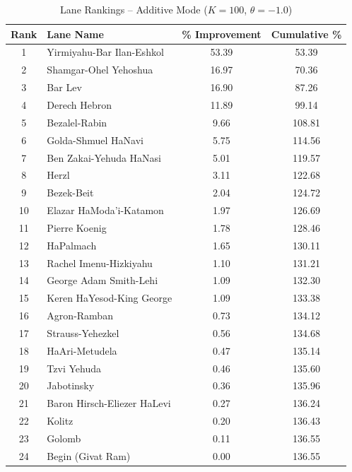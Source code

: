 \begin{table}[H]
\centering
\caption{Lane Rankings -- Additive Mode ($K=100$, $\theta=-1.0$)}
\label{tab:lane_rankings}
\begin{tabular}{@{}clcc@{}}
\toprule
\textbf{Rank} & \textbf{Lane Name} & \textbf{\% Improvement} & \textbf{Cumulative \%} \\
\midrule
1 & Yirmiyahu-Bar Ilan-Eshkol & 53.39 & 53.39 \\
2 & Shamgar-Ohel Yehoshua & 16.97 & 70.36 \\
3 & Bar Lev & 16.90 & 87.26 \\
4 & Derech Hebron & 11.89 & 99.14 \\
5 & Bezalel-Rabin & 9.66 & 108.81 \\
6 & Golda-Shmuel HaNavi & 5.75 & 114.56 \\
7 & Ben Zakai-Yehuda HaNasi & 5.01 & 119.57 \\
8 & Herzl & 3.11 & 122.68 \\
9 & Bezek-Beit & 2.04 & 124.72 \\
10 & Elazar HaModa'i-Katamon & 1.97 & 126.69 \\
11 & Pierre Koenig & 1.78 & 128.46 \\
12 & HaPalmach & 1.65 & 130.11 \\
13 & Rachel Imenu-Hizkiyahu & 1.10 & 131.21 \\
14 & George Adam Smith-Lehi & 1.09 & 132.30 \\
15 & Keren HaYesod-King George & 1.09 & 133.38 \\
16 & Agron-Ramban & 0.73 & 134.12 \\
17 & Strauss-Yehezkel & 0.56 & 134.68 \\
18 & HaAri-Metudela & 0.47 & 135.14 \\
19 & Tzvi Yehuda & 0.46 & 135.60 \\
20 & Jabotinsky & 0.36 & 135.96 \\
21 & Baron Hirsch-Eliezer HaLevi & 0.27 & 136.24 \\
22 & Kolitz & 0.20 & 136.43 \\
23 & Golomb & 0.11 & 136.55 \\
24 & Begin (Givat Ram) & 0.00 & 136.55 \\
\bottomrule
\end{tabular}
\end{table}
